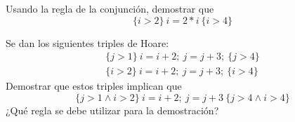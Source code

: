 \begin{ejercicio}
    Usando la regla de la conjunción, demostrar que 
    \begin{equation*}
        \{i>2\}\ i=2\ast i\ \{i>4\}
    \end{equation*}
\end{ejercicio}

\begin{ejercicio}
    Se dan los siguientes triples de Hoare:
    \begin{gather*}
        \{j>1\}\ i=i+2;\ j=j+3;\ \{j>4\} \\
        \{i>2\}\ i=i+2;\ j=j+3;\ \{i>4\}
    \end{gather*}
    Demostrar que estos triples implican que
    \begin{equation*}
        \{j>1 \land i>2\}\ i=i+2;\ j=j+3\ \{j>4 \land i>4\}
    \end{equation*}
    ¿Qué regla se debe utilizar para la demostración?

\end{ejercicio}

